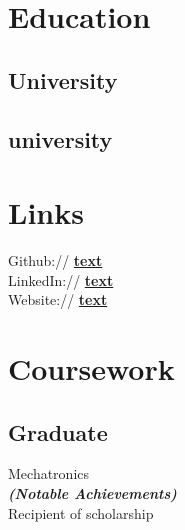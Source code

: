 \documentclass[]{deedy-resume-openfont}
\begin{document}
%
%


%
%

%
%

\begin{minipage}[t]{0.33\textwidth} 


\section{Education} 

\subsection{University}
\sectionsep

\subsection{university}
\sectionsep


\section{Links} 
Github:// \href{link}{\bf text} \\
LinkedIn://  \href{link}{\bf text} \\
Website:// \href{link}{\bf text} \\



\section{Coursework}
\subsection{Graduate}
Mechatronics \\
{\footnotesize \textit{\textbf{(Notable Achievements) }}} \\
Recipient of scholarship \\
\sectionsep


\end{minipage}
\end{document}
